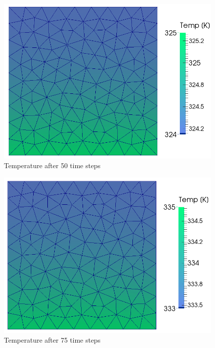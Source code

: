 \documentclass[12pt]{article}
\begin{document}
	\begin{figure}[H]
    \includegraphics[scale=0.4]{box-sequential/boxSequential_ts50.png}
    \centering
    \caption{Temperature after 50 time steps}
	\end{figure}	
	\begin{figure}[H]
    \includegraphics[scale=0.4]{box-sequential/boxSequential_ts75.png}
    \centering
    \caption{Temperature after 75 time steps}
	\end{figure}	
\end{document}

